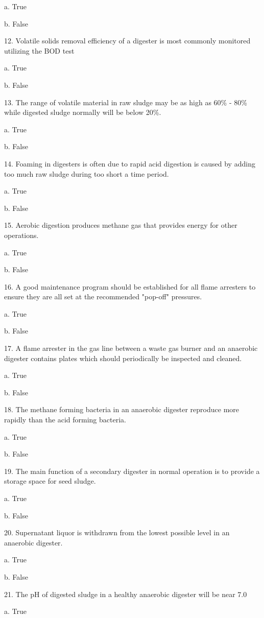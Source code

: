 \documentclass{article}
\begin{document}
a. True 

b. False 


12. Volatile solids removal efficiency of a digester is most commonly monitored utilizing the BOD test

a. True 

b. False 


13. The range of volatile material in raw sludge may be as high as 60\% - 80\% while digested sludge normally will be below 20\%. 

a. True 

b. False 


14. Foaming in digesters is often due to rapid acid digestion is caused by adding too much raw sludge during too short a time period. 

a. True 

b. False 


15. Aerobic digestion produces methane gas that provides energy for other operations. 

a. True 

b. False 


16. A good maintenance program should be established for all flame arresters to ensure they are all set at the recommended "pop-off" pressures. 

a. True 

b. False 


17. A flame arrester in the gas line between a waste gas burner and an anaerobic digester contains plates which should periodically be inspected and cleaned. 

a. True 

b. False 


18. The methane forming bacteria in an anaerobic digester reproduce more rapidly than the acid forming bacteria. 

a. True 

b. False 


19. The main function of a secondary digester in normal operation is to provide a storage space for seed sludge. 

a. True 

b. False 


20. Supernatant liquor is withdrawn from the lowest possible level in an anaerobic digester. 

a. True 

b. False 


21. The pH of digested sludge in a healthy anaerobic digester will be near 7.0 

a. True 
\end{document}
